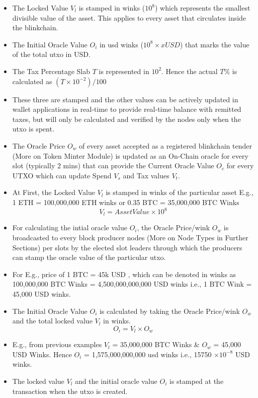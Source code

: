 \documentclass[letterpaper,11pt]{article}
\begin{document}
\begin{itemize}[wide, labelwidth=!, labelindent=0pt]
\item The Locked Value $V_l$ is stamped in winks ($10^8$) which represents the smallest divisible value of the asset. This applies to every asset that circulates inside the blinkchain.
\item The Initial Oracle Value $O_i$ in usd winks ($10^8 \times x USD$) that marks the value of the total utxo in USD.

\item The Tax Percentage Slab $T$ is represented in $10^{2}$. Hence the actual $T\%$ is calculated as $(T \times 10^{-2}) / 100$

\item These three are stamped and the other values can be actively updated in wallet applications in real-time to provide real-time balance with remitted taxes, but will only be calculated and verified by the nodes only when the utxo is spent.
\item The Oracle Price $O_w$ of every asset accepted as a registered blinkchain tender (More on Token Minter Module) is updated as an On-Chain oracle for every slot (typically 2 mins) that can provide the Current Oracle Value $O_c$ for every UTXO which can update Spend $V_s$ and Tax values $V_t$.
\item At First, the Locked Value $V_l$ is stamped in winks of the particular asset E.g., 1 ETH = 100,000,000 ETH winks or 0.35 BTC = 35,000,000 BTC Winks 
\[V_l = Asset Value \times 10^8\]
\item For calculating the intial oracle value $O_i$, the Oracle Price/wink $O_w$ is broadcasted to every block producer nodes (More on Node Types in Further Sections) per slots by the elected slot leaders through which the producers can stamp the oracle value of the particular utxo.
\item For E.g., price of 1 BTC = 45k USD , which can be denoted in winks as 100,000,000 BTC Winks = 4,500,000,000,000 USD winks i.e., 1 BTC Wink = 45,000 USD winks.
\item The Initial Oracle Value $O_i$ is calculated by taking the Oracle Price/wink $O_w$ and the total locked value $V_l$ in winks. 
\[O_i = V_l \times O_w\]
\item E.g., from previous examples $V_l$ = 35,000,000 BTC Winks \& $O_w$ = 45,000 USD Winks. Hence $O_i$ = 1,575,000,000,000 usd winks i.e., 15750 $\times 10^{-8}$ USD winks.
\item The locked value $V_l$ and the initial oracle value $O_i$ is stamped at the transaction when the utxo is created.

\end{itemize}
\end{document}
